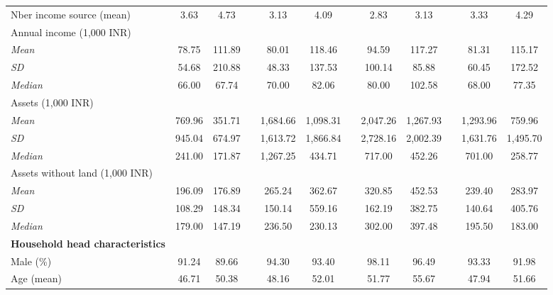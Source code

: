 \documentclass[a4paper, 11pt, onecolumn]{article}
\begin{document}
\begin{table}[htbp]
{\begin{tabular}{lccccccccccc}
    Nber income source (mean) & 3.63 & 4.73 &   & 3.13 & 4.09 &   & 2.83 & 3.13 &   & 3.33 & 4.29 \\
    Annual income (1,000 INR) &   &   &   &   &   &   &   &   &   &   &  \\
    \hspace*{0.2cm} \textit{Mean} & 78.75 & 111.89 &   & 80.01 & 118.46 &   & 94.59 & 117.27 &   & 81.31 & 115.17 \\
    \hspace*{0.2cm} \textit{SD} & 54.68 & 210.88 &   & 48.33 & 137.53 &   & 100.14 & 85.88 &   & 60.45 & 172.52 \\
    \hspace*{0.2cm} \textit{Median} & 66.00 & 67.74 &   & 70.00 & 82.06 &   & 80.00 & 102.58 &   & 68.00 & 77.35 \\
    Assets (1,000 INR) &   &   &   &   &   &   &   &   &   &   &  \\
    \hspace*{0.2cm} \textit{Mean} & 769.96 & 351.71 &   & 1,684.66 & 1,098.31 &   & 2,047.26 & 1,267.93 &   & 1,293.96 & 759.96 \\
    \hspace*{0.2cm} \textit{SD} & 945.04 & 674.97 &   & 1,613.72 & 1,866.84 &   & 2,728.16 & 2,002.39 &   & 1,631.76 & 1,495.70 \\
    \hspace*{0.2cm} \textit{Median} & 241.00 & 171.87 &   & 1,267.25 & 434.71 &   & 717.00 & 452.26 &   & 701.00 & 258.77 \\
    Assets without land (1,000 INR) &   &   &   &   &   &   &   &   &   &   &  \\
    \hspace*{0.2cm} \textit{Mean} & 196.09 & 176.89 &   & 265.24 & 362.67 &   & 320.85 & 452.53 &   & 239.40 & 283.97 \\
    \hspace*{0.2cm} \textit{SD} & 108.29 & 148.34 &   & 150.14 & 559.16 &   & 162.19 & 382.75 &   & 140.64 & 405.76 \\
    \hspace*{0.2cm} \textit{Median} & 179.00 & 147.19 &   & 236.50 & 230.13 &   & 302.00 & 397.48 &   & 195.50 & 183.00 \\
    \textbf{Household head characteristics} &   &   &   &   &   &   &   &   &   &   &  \\
    Male (\%) & 91.24 & 89.66 &   & 94.30 & 93.40 &   & 98.11 & 96.49 &   & 93.33 & 91.98 \\
    Age (mean) & 46.71 & 50.38 &   & 48.16 & 52.01 &   & 51.77 & 55.67 &   & 47.94 & 51.66 \\

\end{tabular}}
\end{table}
\end{document}
